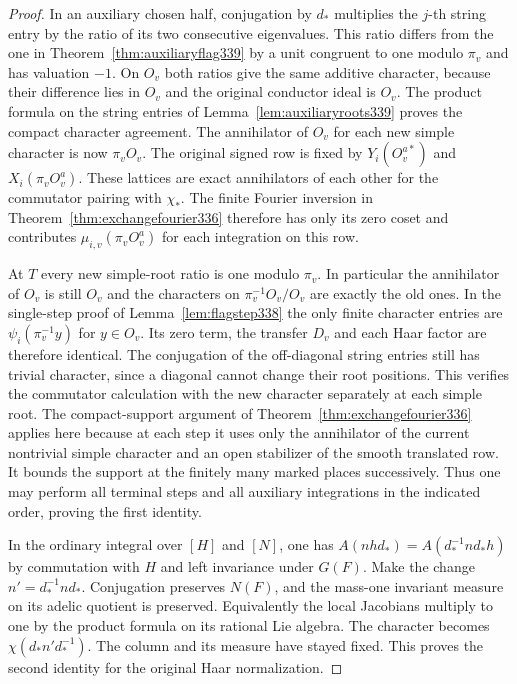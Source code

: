 \documentclass[a4paper,11pt]{article}
\theoremstyle{definition}
\theoremstyle{remark}
\numberwithin{equation}{section}
\begin{document}
\begin{proof}
In an auxiliary chosen half, conjugation by $d_*$ multiplies the
$j$-th string entry by the ratio of its two consecutive eigenvalues.
This ratio differs from the one in Theorem~\ref{thm:auxiliaryflag339}
by a unit congruent to one modulo $\pi_v$ and has valuation $-1$.
On $O_v$ both ratios give the same additive character, because their
difference lies in $O_v$ and the original conductor ideal is $O_v$.
The product formula on the string entries of
Lemma~\ref{lem:auxiliaryroots339} proves the compact character
agreement. The annihilator of $O_v$ for each new simple character
is now $\pi_v O_v$. The original signed row is fixed by
$Y_i(O_v^{a*})$ and $X_i(\pi_v O_v^a)$. These lattices are exact
annihilators of each other for the commutator pairing with $\chi_*$.
The finite Fourier inversion in Theorem~\ref{thm:exchangefourier336}
therefore has only its zero coset and contributes
$\mu_{i,v}(\pi_v O_v^a)$ for each integration on this row.

At $T$ every new simple-root ratio is one modulo $\pi_v$. In
particular the annihilator of $O_v$ is still $O_v$ and the
characters on $\pi_v^{-1}O_v/O_v$ are exactly the old ones. In the
single-step proof of Lemma~\ref{lem:flagstep338} the only finite
character entries are $\psi_i(\pi_v^{-1}y)$ for $y\in O_v$. Its
zero term, the transfer $D_v$ and each Haar factor are therefore
identical. The conjugation of the off-diagonal string entries still
has trivial character, since a diagonal cannot change their root
positions. This verifies the commutator calculation with the new
character separately at each simple root. The compact-support
argument of Theorem~\ref{thm:exchangefourier336} applies here because
at each step it uses only the annihilator of the current nontrivial
simple character and an open stabilizer of the smooth translated
row. It bounds the support at the finitely many marked places
successively. Thus one may perform all terminal steps and all
auxiliary integrations in the indicated order, proving the first
identity.

In the ordinary integral over $[H]$ and $[N]$, one has
$A(nh d_*)=A(d_*^{-1}n d_* h)$ by commutation with $H$ and left
invariance under $G(F)$. Make the change $n'=d_*^{-1}n d_*$.
Conjugation preserves $N(F)$, and the mass-one invariant measure
on its adelic quotient is preserved. Equivalently the local
Jacobians multiply to one by the product formula on its rational
Lie algebra. The character becomes $\chi(d_* n' d_*^{-1})$.
The column and its measure have stayed fixed. This proves the
second identity for the original Haar normalization.
\end{proof}
\end{document}
